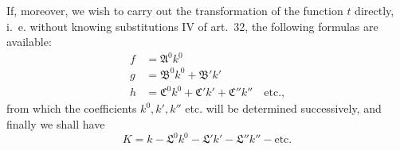 If, moreover, we wish to carry out the transformation of the function \(t\) directly, i.\ e. without knowing substitutions IV of art.\ 32, the following formulas are available:
\[
\begin{aligned}
f&=\mathfrak{A}^0k^0\\
g&=\mathfrak{B}^0k^0+\mathfrak{B}'k'\\
h&=\mathfrak{C}^0k^0+\mathfrak{C}'k'+\mathfrak{C}''k''\quad\text{etc.,}
\end{aligned}
\]
from which the coefficients \(k^0,k',k''\) etc. will be determined successively, and finally we shall have
\[
K=k-\mathfrak{L}^0k^0-\mathfrak{L}'k'-\mathfrak{L}''k''-\text{etc.}
\]

\clearpage
